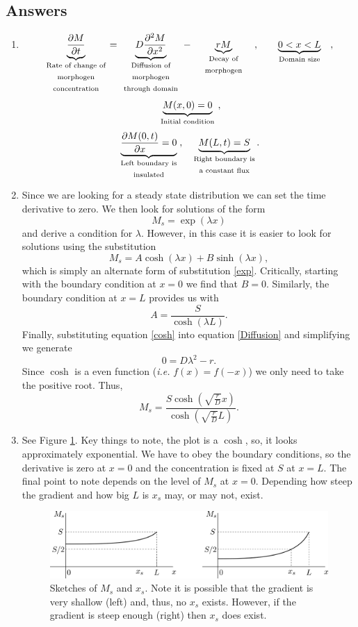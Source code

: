 \documentclass[10pt]{article}
\newcommand{\bb}{\begin{equation}}
\newcommand{\ee}{\end{equation}}
\newcommand{\D}[2]{\frac{\partial #1}{\partial #2}}
\newcommand{\DD}[2]{\frac{\partial^2 #1}{\partial #2^2}}
\newcommand{\UB}[2]{\underbrace{#1}_{\textrm{\parbox{8em}{\centering #2}}}}
\newcommand{\fig}[1]{Figure \ref{#1}}
\newcommand{\eqn}[1]{equation \eqref{#1}}
\newcommand{\ie}{\emph{i.e.} }
\renewcommand{\l}{\left(}
\renewcommand{\r}{\right)}
\begin{document}
\begin{Answ}
\subsection{Answers}
\begin{enumerate}
\item 

\bb
\UB{\D{M}{t}}{Rate of change of morphogen concentration}=\UB{D\DD{M}{x}}{Diffusion of morphogen through domain}-\UB{rM}{Decay of morphogen},\quad \UB{0<x<L}{Domain size},
\ee\bb
\UB{M(x,0)=0}{Initial condition},
\ee\bb
\UB{\D{M(0,t)}{x}=0}{Left boundary is insulated},\quad \UB{M(L,t)=S}{Right boundary is a constant flux}.
\ee

\item Since we are looking for a steady state distribution we can set the time derivative to zero. We then look for solutions of the form
\bb
M_s=\exp(\lambda x)\label{exp}
\ee
and derive a condition for $\lambda$. However, in this case it is easier to look for solutions using the substitution
\bb
M_s=A\cosh(\lambda x)+B\sinh(\lambda x),\label{cosh}
\ee
which is simply an alternate form of substitution \eqref{exp}.
Critically, starting with the boundary condition at $x=0$ we find that $B=0$. Similarly, the boundary condition at $x=L$ provides us with
\bb
A=\frac{S}{\cosh(\lambda L)}.
\ee
Finally, substituting \eqn{cosh} into \eqn{Diffusion} and simplifying we generate
\bb
0=D\lambda^2-r.
\ee
Since $\cosh$ is a even function (\ie $f(x)=f(-x)$) we only need to take the positive root. Thus,
\bb
M_s=\frac{S\cosh\l \sqrt{\frac{r}{D}} x\r}{\cosh\l \sqrt{\frac{r}{D}} L\r}.
\ee


\item See \fig{Gradient_plot}. Key things to note, the plot is a $\cosh$, so, it looks approximately exponential. We have to obey the boundary conditions, so the derivative is zero at $x=0$ and the concentration is fixed at $S$ at $x=L$. The final point to note depends on the level of $M_s$ at $x=0$. Depending how steep the gradient and how big $L$ is $x_s$ may, or may not, exist.
\begin{figure}[h!!!tb]
\centering
\includegraphics[width=\textwidth]{../../Pictures/Gradient_plot.png}
\caption{\label{Gradient_plot} Sketches of $M_s$ and $x_s$. Note it is possible that the gradient is very shallow (left) and, thus, no $x_s$ exists. However, if the gradient is steep enough (right) then $x_s$ does exist.}
\end{figure}



\end{enumerate}
\end{Answ}
\end{document}
